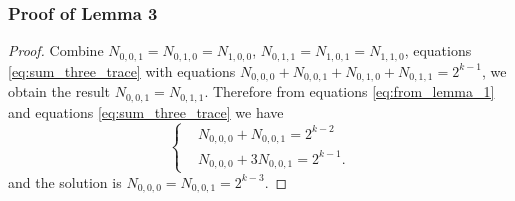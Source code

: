 \documentclass[
    aspectratio=169,                   %
]{beamer}
\newcommand{\F}{\mathbb{F}}
\newcommand{\tr}{\operatorname{tr}_1^k}
\begin{document}
        \begin{frame}
            \frametitle{Proof of Lemma 3}        
        
            \begin{proof}
                
            Combine $ N_{0,0,1}=N_{0,1,0}=N_{1,0,0} $,  $ N_{0,1,1}=N_{1,0,1}=N_{1,1,0} $, equations \eqref{eq:sum_three_trace} with equations $ N_{0,0,0}+N_{0,0,1}+N_{0,1,0}+N_{0,1,1}=2^{k-1} $, 
              we obtain the result $ N_{0,0,1}=N_{0,1,1} $. 
              Therefore from equations \eqref{eq:from_lemma_1} and equations \eqref{eq:sum_three_trace} we have 
              \begin{equation}\left\{\begin{alignedat}{2}
                      &N_{0,0,0}+N_{0,0,1}=2^{k-2}\\
                      &N_{0,0,0}+3N_{0,0,1}=2^{k-1}.
              \end{alignedat}\right.\end{equation}
              and the solution is $ N_{0,0,0}=N_{0,0,1}=2^{k-3} $.
            \end{proof}
        \end{frame}
    \makebottom     %
\end{document}
